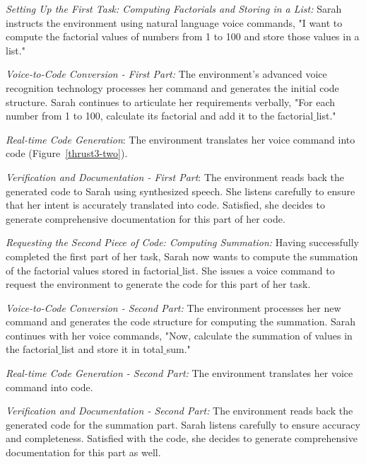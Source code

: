 {\em Setting Up the First Task: Computing Factorials and Storing in a
  List:} Sarah instructs the environment using natural language voice
commands, "I want to compute the factorial values of numbers from 1 to
100 and store those values in a list."

{\em Voice-to-Code Conversion - First Part:} The environment's
advanced voice recognition technology processes her command and
generates the initial code structure. Sarah continues to articulate
her requirements verbally, "For each number from 1 to 100, calculate
its factorial and add it to the factorial$\_$list."

{\em Real-time Code Generation}:
The environment translates her voice command into code (Figure~\ref{thrust3-two}).

{\em Verification and Documentation - First Part}: The environment
reads back the generated code to Sarah using synthesized speech. She
listens carefully to ensure that her intent is accurately translated
into code. Satisfied, she decides to generate comprehensive
documentation for this part of her code.


{\em Requesting the Second Piece of Code: Computing Summation:} Having
successfully completed the first part of her task, Sarah now wants to
compute the summation of the factorial values stored in
factorial$\_$list. She issues a voice command to request the environment
to generate the code for this part of her task.

{\em Voice-to-Code Conversion - Second Part:} The environment
processes her new command and generates the code structure for
computing the summation.
Sarah continues with her voice commands, "Now, calculate the summation
of values in the factorial$\_$list and store it in total$\_$sum."

{\em Real-time Code Generation - Second Part:}
The environment translates her voice command into code.

{\em Verification and Documentation - Second Part:} The environment
reads back the generated code for the summation part. Sarah listens
carefully to ensure accuracy and completeness. Satisfied with the
code, she decides to generate comprehensive documentation for this
part as well.

